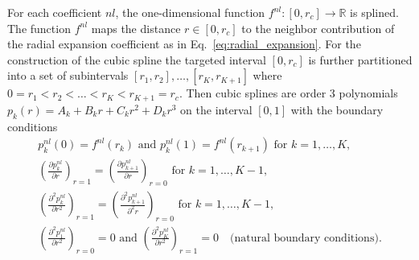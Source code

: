 For each coefficient $nl$, the one-dimensional function $f^{nl}:[0,r_c]\rightarrow\mathbb{R}$ is splined.
The function $f^{nl}$ maps the distance $r\in[0,r_c]$ to the neighbor contribution of the radial expansion coefficient as in Eq.~\eqref{eq:radial_expansion}.
For the construction of the cubic spline the targeted interval $[0,r_c]$ is further partitioned into a set of subintervals $[r_1, r_2], \ldots, [r_{K}, r_{K+1}]$ where $0 = r_1 < r_2 < \ldots < r_{K} < r_{K+1} = r_c$.
Then cubic splines are order 3 polynomials $p_k(r) = A_k + B_kr + C_kr^2 + D_kr^3$ on the interval $[0,1]$ with the boundary conditions
\begin{subequations}
\label{eq:abscissas_boundary_conditions}
\begin{gather}
    p^{nl}_{k}(0) = f^{nl}(r_k)\text{ and } p^{nl}_{k}(1) =  f^{nl}(r_{k+1})\text{ for } k=1,\ldots,K , \label{eq:function_boundary_conditions}\\
    \left(\frac{\partial p^{nl}_{k}}{\partial r}\right)_{r=1} = \left(\frac{\partial p^{nl}_{k+1}}{\partial r}\right)_{r=0} \text{ for } k=1,\ldots,K-1  ,\label{eq:derivative_boundary_conditions}\\
    \left(\frac{\partial^2 p^{nl}_{k}}{\partial r^2}\right)_{r=1} = \left(\frac{\partial^2 p^{nl}_{k+1}}{\partial^2 r}\right)_{r=0} \text{ for } k=1,\ldots,K-1  ,\label{eq:second_derivative_boundary_conditions}\\
    \left(\frac{\partial^2 p^{nl}_{1}}{\partial r^2}\right)_{r=0} = 0\text{ and } \left(\frac{\partial^2 p^{nl}_{K}}{\partial r^2}\right)_{r=1}=0\quad\text{(natural boundary conditions)}.\label{eq:natural_boundary_conditions}
\end{gather}
\end{subequations}
